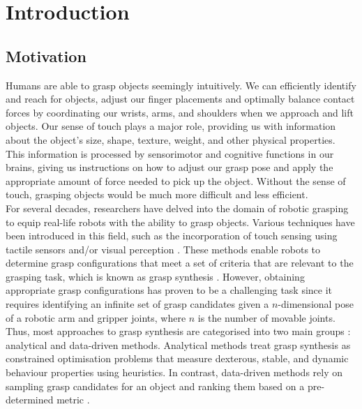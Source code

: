 \documentclass[11pt, a4paper]{report}
\begin{document}
\tableofcontents


\chapter{Introduction}\label{chap:1}
\setcounter{page}{1}


\section{Motivation}\label{sec:1.1}
Humans are able to grasp objects seemingly intuitively. We can efficiently identify and reach for objects, adjust our finger placements and optimally balance contact forces by coordinating our wrists, arms, and shoulders when we approach and lift objects. Our sense of touch plays a major role, providing us with information about the object's size, shape, texture, weight, and other physical properties. This information is processed by sensorimotor and cognitive functions \cite{castiello2005} in our brains, giving us instructions on how to adjust our grasp pose and apply the appropriate amount of force needed to pick up the object. Without the sense of touch, grasping objects would be much more difficult and less efficient.\\

For several decades, researchers have delved into the domain of robotic grasping to equip real-life robots with the ability to grasp objects. Various techniques have been introduced in this field, such as the incorporation of touch sensing \cite{de_Farias_2021} using tactile sensors \cite{Lambeta2020DIGIT, liu2022gelsight} and/or visual perception \cite{Calandra_2018}. These methods enable robots to determine grasp configurations that meet a set of criteria that are relevant to the grasping task, which is known as grasp synthesis \cite{Bohg_2014}. However, obtaining appropriate grasp configurations has proven to be a challenging task since it requires identifying an infinite set of grasp candidates given a $n$-dimensional pose of a robotic arm and gripper joints, where $n$ is the number of movable joints. Thus, most approaches to grasp synthesis are categorised into two main groups \cite{Bohg_2014, SAHBANI2012326}: analytical and data-driven methods. Analytical methods treat grasp synthesis as constrained optimisation problems that measure dexterous, stable, and dynamic behaviour properties using heuristics. In contrast, data-driven methods rely on sampling grasp candidates for an object and ranking them based on a pre-determined metric \cite{Bohg_2014}.\\
\end{document}
